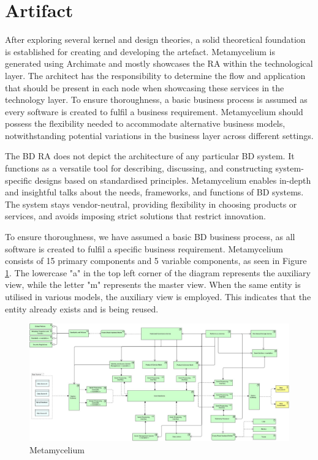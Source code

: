 \documentclass[journal]{IEEEtran}
\begin{document}
\section{Artifact} \label{sec:artifact}

After exploring several kernel and design theories, a solid theoretical foundation is established for creating and developing the artefact. Metamycelium is generated using Archimate and mostly showcases the RA within the technological layer. The architect has the responsibility to determine the flow and application that should be present in each node when showcasing these services in the technology layer. To ensure thoroughness, a basic business process is assumed as every software is created to fulfil a business requirement. Metamycelium should possess the flexibility needed to accommodate alternative business models, notwithstanding potential variations in the business layer across different settings.

The BD RA does not depict the architecture of any particular BD system. It functions as a versatile tool for describing, discussing, and constructing system-specific designs based on standardised principles. Metamycelium enables in-depth and insightful talks about the needs, frameworks, and functions of BD systems. The system stays vendor-neutral, providing flexibility in choosing products or services, and avoids imposing strict solutions that restrict innovation. 

To ensure thoroughness, we have assumed a basic BD business process, as all software is created to fulfil a specific business requirement. Metamycelium consists of 15 primary components and 5 variable components, as seen in Figure \ref{fig:Metamycelium}. The lowercase "a" in the top left corner of the diagram represents the auxiliary view, while the letter "m" represents the master view. When the same entity is utilised in various models, the auxiliary view is employed. This indicates that the entity already exists and is being reused. 


\begin{figure}
  \centering
  \includegraphics[width=\linewidth]{images/Metamycelium.jpg}
  \caption{Metamycelium}
  \label{fig:Metamycelium}
\end{figure}
\end{document}
